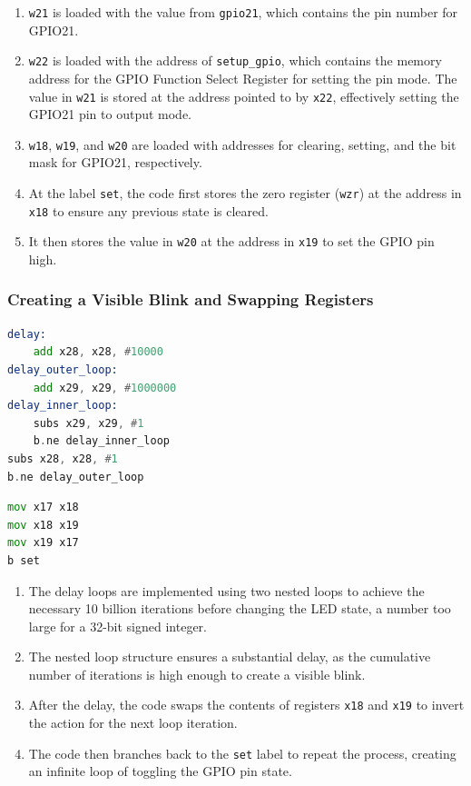 \documentclass{article}
\begin{document}
\begin{enumerate}[itemsep=0.5mm]
    \item \verb|w21| is loaded with the value from \verb|gpio21|, which contains the pin number for GPIO21.
    \item \verb|w22| is loaded with the address of \verb|setup_gpio|, which contains the memory address for the GPIO Function Select Register for setting the pin mode. The value in \verb|w21| is stored at the address pointed to by \verb|x22|, effectively setting the GPIO21 pin to output mode.
    \item \verb|w18|, \verb|w19|, and \verb|w20| are loaded with addresses for clearing, setting, and the bit mask for GPIO21, respectively.
    \item At the label \verb|set|, the code first stores the zero register (\verb|wzr|) at the address in \verb|x18| to ensure any previous state is cleared.
    \item It then stores the value in \verb|w20| at the address in \verb|x19| to set the GPIO pin high.
\end{enumerate}

\subsubsection{Creating a Visible Blink and Swapping Registers}

\begin{minipage}{0.45\textwidth}
\begin{lstlisting}[language=asm, caption=Delay Loops]
delay:
    add x28, x28, #10000
delay_outer_loop:
    add x29, x29, #1000000
delay_inner_loop:
    subs x29, x29, #1
    b.ne delay_inner_loop
subs x28, x28, #1
b.ne delay_outer_loop
\end{lstlisting}
\end{minipage}
\hfill
\begin{minipage}{0.45\textwidth}
\begin{lstlisting}[language=asm, caption=x18 and x19 Swapping]
mov x17 x18
mov x18 x19
mov x19 x17
b set
\end{lstlisting}
\end{minipage}

\begin{enumerate}[itemsep=0.5mm]
    \item The delay loops are implemented using two nested loops to achieve the necessary 10 billion iterations before changing the LED state, a number too large for a 32-bit signed integer.
    \item The nested loop structure ensures a substantial delay, as the cumulative number of iterations is high enough to create a visible blink.
    \item After the delay, the code swaps the contents of registers \verb|x18| and \verb|x19| to invert the action for the next loop iteration.
    \item The code then branches back to the \verb|set| label to repeat the process, creating an infinite loop of toggling the GPIO pin state.
\end{enumerate}
\end{document}
